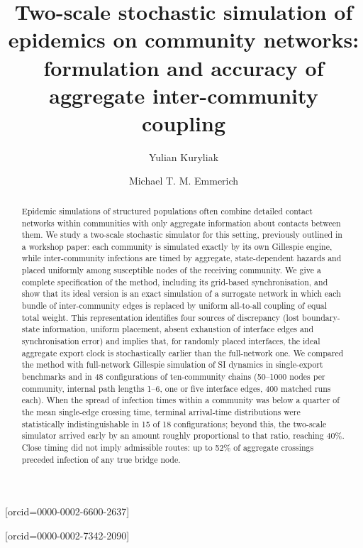 \documentclass[a4paper,fleqn]{cas-sc}
\begin{document}
\let\WriteBookmarks\relax
\def\floatpagepagefraction{1}
\def\textpagefraction{.001}


\title[mode=title]{Two-scale stochastic simulation of epidemics on community networks: formulation and accuracy of aggregate inter-community coupling}

\author[1]{Yulian Kuryliak}[orcid=0000-0002-6600-2637]
\cormark[1]

\author[2]{Michael T. M. Emmerich}[orcid=0000-0002-7342-2090]


\begin{abstract}
Epidemic simulations of structured populations often combine detailed contact networks within communities with only aggregate information about contacts between them. We study a two-scale stochastic simulator for this setting, previously outlined in a workshop paper: each community is simulated exactly by its own Gillespie engine, while inter-community infections are timed by aggregate, state-dependent hazards and placed uniformly among susceptible nodes of the receiving community. We give a complete specification of the method, including its grid-based synchronisation, and show that its ideal version is an exact simulation of a surrogate network in which each bundle of inter-community edges is replaced by uniform all-to-all coupling of equal total weight. This representation identifies four sources of discrepancy (lost boundary-state information, uniform placement, absent exhaustion of interface edges and synchronisation error) and implies that, for randomly placed interfaces, the ideal aggregate export clock is stochastically earlier than the full-network one. We compared the method with full-network Gillespie simulation of SI dynamics in single-export benchmarks and in 48 configurations of ten-community chains (50--1000 nodes per community, internal path lengths 1--6, one or five interface edges, 400 matched runs each). When the spread of infection times within a community was below a quarter of the mean single-edge crossing time, terminal arrival-time distributions were statistically indistinguishable in 15 of 18 configurations; beyond this, the two-scale simulator arrived early by an amount roughly proportional to that ratio, reaching 40\%. Close timing did not imply admissible routes: up to 52\% of aggregate crossings preceded infection of any true bridge node.
\end{abstract}
\end{document}
